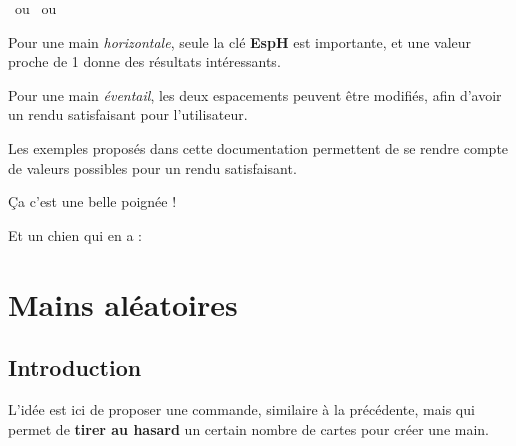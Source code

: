 \documentclass{article}
\newcommand\Cle[1]{{\bfseries\sffamily\textlangle #1\textrangle}}
\begin{document}
{{{{{{{\begin{codetex}[]
~ou 
~ou 
\end{codetex}

\begin{codeinfo}
Pour une main \textit{horizontale}, seule la clé \Cle{EspH} est importante, et une valeur proche de 1 donne des résultats intéressants.

\smallskip

Pour une main \textit{éventail}, les deux espacements peuvent être modifiés, afin d'avoir un rendu satisfaisant pour l'utilisateur.

\smallskip

Les exemples proposés dans cette documentation permettent de se rendre compte de valeurs possibles pour un rendu satisfaisant.
\end{codeinfo}

\begin{codetex}[]

\smallskip


\smallskip

Ça c'est une belle poignée ! 

\smallskip

Et un chien qui en a  : 
\end{codetex}

\pagebreak

\section{Mains aléatoires}

\subsection{Introduction}

\begin{codeidee}
L'idée est ici de proposer une commande, similaire à la précédente, mais qui permet de \textbf{tirer au hasard} un certain nombre de cartes pour créer une main.
\end{codeidee}

}}}}}}}
\end{document}
